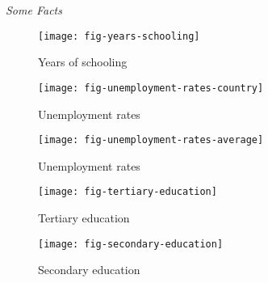 \begin{frame}\begin{center}
		\LARGE\textit{Some Facts}
\end{center}\end{frame}
\begin{frame}
	\begin{figure}[htp]\centering
		\caption{Years of schooling}\scalebox{0.35}
		{\texttt{[image: fig-years-schooling]}}
	\end{figure}
\end{frame}
\begin{frame}
	\begin{figure}[htp]\centering
		\caption{Unemployment rates}\scalebox{0.35}
		{\texttt{[image: fig-unemployment-rates-country]}}
	\end{figure}
\end{frame}
\begin{frame}
	\begin{figure}[htp]\centering
		\caption{Unemployment rates}\scalebox{0.35}
		{\texttt{[image: fig-unemployment-rates-average]}}
	\end{figure}
\end{frame}
\begin{frame}
	\begin{figure}[htp]\centering
		\caption{Tertiary education}\scalebox{0.35}
		{\texttt{[image: fig-tertiary-education]}}
	\end{figure}
\end{frame}
\begin{frame}
	\begin{figure}[htp]\centering
		\caption{Secondary education}\scalebox{0.35}
		{\texttt{[image: fig-secondary-education]}}
	\end{figure}
\end{frame}
